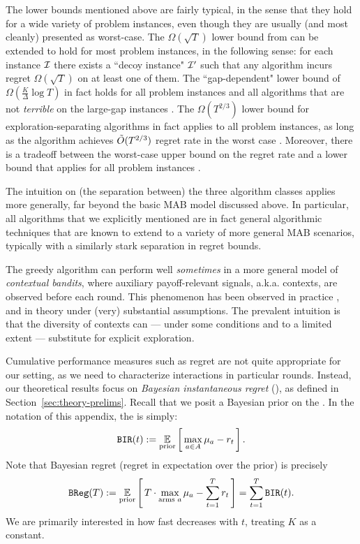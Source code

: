 The lower bounds mentioned above are fairly typical, in the sense that they hold for a wide variety of problem instances, even though they are usually (and most cleanly) presented as worst-case. The $\Omega(\sqrt{T})$ lower bound from \citet{bandits-exp3} can be extended to hold for most problem instances, in the following sense: for each instance $\mathcal{I}$ there exists a ``decoy instance" $\mathcal{I}'$ such that any algorithm incurs regret $\Omega(\sqrt{T})$ on at least one of them. The ``gap-dependent" lower bound of
 $\Omega(\tfrac{K}{\Delta}\log T)$
in fact holds for all problem instances and all algorithms that are not \emph{terrible} on the large-gap instances \citep{Lai-Robbins-85}. The $\Omega(T^{2/3})$ lower bound for exploration-separating algorithms in fact applies to all problem instances, as long as the algorithm achieves $\tilde{O}(T^{2/3})$ regret rate in the worst case \citep{MechMAB-ec09}. 
Moreover, there is a tradeoff between the worst-case upper bound on the regret rate and a lower bound that applies for all problem instances \citep[Theorem 4.3 in][using the same proof technique]{MechMAB-ec09}.

The intuition on (the separation between) the three algorithm classes applies more generally, far beyond the basic MAB model discussed above. In particular, all algorithms that we explicitly mentioned are in fact general algorithmic techniques that are known to extend to a variety of more general MAB scenarios, typically with a similarly stark separation in regret bounds.


The greedy algorithm can perform well \emph{sometimes} in a more general model of \emph{contextual bandits}, where auxiliary payoff-relevant signals, a.k.a. contexts, are observed before each round. This phenomenon has been observed in practice
\citep{practicalCB-arxiv18}, and in theory \citep{kannan2018smoothed,bastani2017exploiting,externalities-colt18} under (very) substantial assumptions. The prevalent intuition is that the diversity of contexts can --- under some conditions and to a limited extent --- substitute for explicit exploration.

Cumulative performance measures such as regret are not quite appropriate for our setting, as we need to characterize interactions in particular rounds. Instead, our theoretical results focus on \emph{Bayesian instantaneous regret} (\BIR), as defined in Section~\ref{sec:theory-prelims}. Recall that we posit a Bayesian prior on the \MRVs. In the notation of this appendix, the \BIR is simply:
\begin{align*}%
\BIR(t) := \E_{\text{prior}}\sbr{ \max_{a\in A} \mu_a - r_t}.
\end{align*}
\noindent Note that Bayesian regret (\ie regret in expectation over the prior) is precisely
\begin{align}\label{eq:bg-BReg}
  \BReg(T):=
    \E_{\text{prior}}\sbr{ T\cdot \max_{\text{arms $a$}}\mu_a - \sum_{t=1}^T r_t }
    = \sum_{t=1}^T \BIR(t).
\end{align}
We are primarily interested in how fast \BIR decreases with $t$, treating $K$ as a constant.


